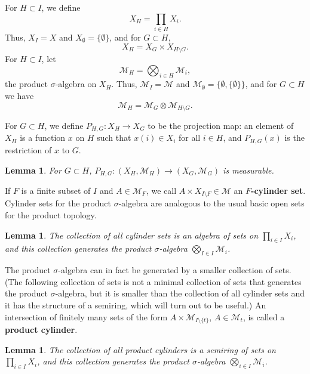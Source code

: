\documentclass{article}
\newtheorem{lemma}[theorem]{Lemma}
\theoremstyle{definition}
\begin{document}
For $H \subset I$, we define
\[
X_H = \prod_{i \in H} X_i.
\]
Thus, $X_I = X$ and $X_{\emptyset}=\{\emptyset\}$, and for $G \subset H$,
\[
X_H = X_G \times X_{H \setminus G}.
\]
For $H \subset I$, let
\[
\mathscr{M}_H=\bigotimes_{i \in H} \mathscr{M}_i,
\]
 the product $\sigma$-algebra on $X_H$.  Thus,  $\mathscr{M}_I=\mathscr{M}$ and
 $\mathscr{M}_{\emptyset}=\{\emptyset,\{\emptyset\}\}$, and for $G \subset H$ we have
 \[
 \mathscr{M}_H = \mathscr{M}_G \otimes \mathscr{M}_{H \setminus G}.
 \]
 
 
 For $G \subset H$, we define $P_{H,G}:X_H \to X_G$ to be the projection map: an element of $X_H$ is a function $x$ on $H$ such that $x(i) \in X_i$
for all $i \in H$,
and $P_{H,G}(x)$ is the restriction of $x$ to $G$.
 
 \begin{lemma}
For $G \subset H$,  $P_{H,G}:(X_H,\mathscr{M}_H) \to 
 (X_G,\mathscr{M}_G)$ is measurable. 
 \label{projmeasurable}
 \end{lemma}
 

If $F$ is a finite subset of $I$ and $A \in \mathscr{M}_F$, we call $A \times X_{I \setminus F} \in
\mathscr{M}$
an  \textbf{$F$-cylinder set}. Cylinder sets for the product $\sigma$-algebra are analogous to the usual basic open sets for the product topology.

\begin{lemma}
The collection of all cylinder sets 
is an algebra of sets on $\prod_{i \in I} X_i$,
and  this collection generates the product $\sigma$-algebra $\bigotimes_{I \in I} \mathscr{M}_i$.
\label{cylinderlemma}
\end{lemma}

 The product $\sigma$-algebra
can in fact be generated by a smaller collection of sets. (The following collection of sets is not a minimal collection of sets that generates the product $\sigma$-algebra,
but it is smaller than the collection of all cylinder sets and it has the structure of a semiring, which will turn out to be useful.)
An intersection of finitely many sets of the form $A \times \mathscr{M}_{I \setminus \{t\}}$, $A \in \mathscr{M}_t$, is called a \textbf{product cylinder}.

\begin{lemma}
The collection of all  product cylinders is a semiring of sets on $\prod_{i \in I} X_i$, and this collection
generates the product $\sigma$-algebra  $\bigotimes_{i \in I} \mathscr{M}_i$.
\label{specialcylinder}
\end{lemma}
\end{document}

